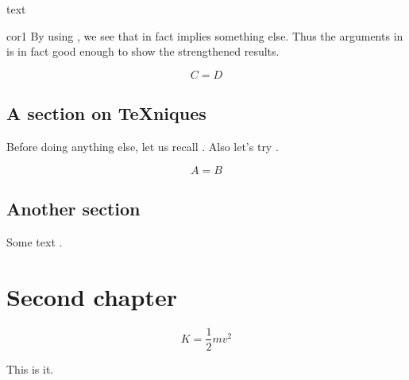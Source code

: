 \documentclass[noocg]{wwwnotes2}
\begin{document}
\begin{cor}
	\lipsum[24]

	text
\end{cor}

\begin{pfof}{cor1}
	By using , we see that  in fact implies something else. Thus the arguments in  is in fact good enough to show the strengthened results. 
\end{pfof}

\begin{equation}
	C = D
\end{equation}

\section{A section on \TeX{}niques}

Before doing anything else, let us recall . Also let's try .

\lipsum[2]

\begin{equation}
	A = B
\end{equation}

\lipsum[3-8]



\section{Another section}

\lipsum[5-9]

Some text \cite{Wong2009}.


\chapter{Second chapter}


\lipsum[10-23]

\begin{equation}
K = \frac12 mv^2
\end{equation}

This is it.


\cleardoublepage
\printbibliography[heading=bibintoc]
\end{document}
